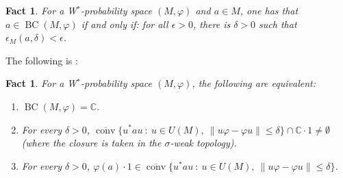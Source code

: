 \documentclass[12pt]{amsart}
\newtheorem{fact}[thm]{Fact}
\theoremstyle{definition}
\def\bb{\mathbb}
\def\bb{\mathbb}
\def\BC{\operatorname{BC}}
\begin{document}
\begin{fact}\label{haagerupBCchar}
For a W$^*$-probability space $(M,\varphi)$ and $a\in M$, one has that $a\in \BC(M,\varphi)$ if and only if:  for all $\epsilon>0$, there is $\delta>0$ such that $\epsilon_M(a,\delta)<\epsilon$.
\end{fact}

The following is \cite[Proposition 1.3(2) and Remark 1.4]{haagerup87}:

\begin{fact}
For a W$^*$-probability space $(M,\varphi)$, the following are equivalent:
\begin{enumerate}
    \item $\BC(M,\varphi)=\bb C$.
    \item For every $\delta>0$, $\overline{\operatorname{conv}}\{u^*au \ : \ u\in U(M), \ \|u\varphi-\varphi u\|\leq \delta\}\cap \bb C\cdot 1\not=\emptyset$ (where the closure is taken in the $\sigma$-weak topology).
    \item For every $\delta>0$, $\varphi(a)\cdot 1\in \overline{\operatorname{conv}}\{u^*au \ : \ u\in U(M), \ \|u\varphi-\varphi u\|\leq \delta\}$.
\end{enumerate}
\end{fact}
\end{document}
